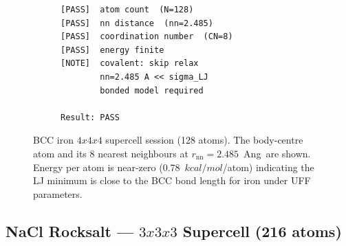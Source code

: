 \documentclass[11pt,twoside]{article}
\def\AA{Ang}%
\def\times{x}%
\def\kcalmol{kcal/mol}%
\newcommand{\kcalmol}{\text{kcal/mol}}
\begin{document}
\begin{figure}[H]
\begin{subfigure}[b]{0.50\textwidth}
\begin{lstlisting}[language={}, basicstyle=\ttfamily\scriptsize,
  frame=single, caption={Session: \texttt{xtal\_002\_bcc\_fe}}]
[PASS]  atom count  (N=128)
[PASS]  nn distance  (nn=2.485)
[PASS]  coordination number  (CN=8)
[PASS]  energy finite
[NOTE]  covalent: skip relax
        nn=2.485 A << sigma_LJ
        bonded model required

Result: PASS
\end{lstlisting}
\end{subfigure}
\caption{BCC iron $4{\times}4{\times}4$ supercell session (128 atoms). The body-centre atom and its 8 nearest neighbours at $r_{\mathrm{nn}} = 2.485$~\AA\ are shown. Energy per atom is near-zero (0.78~$\kcalmol$/atom) indicating the LJ minimum is close to the BCC bond length for iron under UFF parameters.}
\label{fig:bcc-fe}
\end{figure}

\subsection{NaCl Rocksalt --- $3 \times 3 \times 3$ Supercell (216 atoms)}
\end{document}
